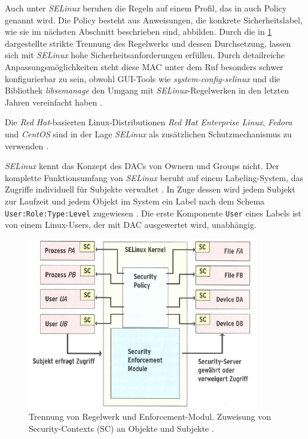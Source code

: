 \documentclass[../main.tex]{subfiles}
\begin{document}

				Auch unter \emph{SELinux} beruhen die Regeln auf einem Profil, das in auch Policy genannt wird. Die Policy besteht aus Anweisungen, die konkrete Sicherheitslabel, wie sie im nächsten Abschnitt beschrieben sind, abbilden. Durch die in \fig \ref{fig:sec_SELinux} dargestellte strikte Trennung des Regelwerks und dessen Durchsetzung, lassen sich mit \emph{SELinux} hohe Sicherheitsanforderungen erfüllen. Durch detailreiche Anpassungsmöglichkeiten steht diese MAC unter dem Ruf besonders schwer konfigurierbar zu sein, obwohl GUI-Tools wie \emph{system-config-selinux} und die Bibliothek \emph{libsemanage} den Umgang mit \emph{SELinux}-Regelwerken in den letzten Jahren vereinfacht haben \cite[S.62,S.67]{linuxMagazineSec}.

				Die \emph{Red Hat}-basierten Linux-Distributionen \emph{Red Hat Enterprise Linux}, \emph{Fedora} und \emph{CentOS} sind in der Lage \emph{SELinux} als zusätzlichen Schutzmechanismus zu verwenden \cite{dockerSecurity}.

				\emph{SELinux} kennt das Konzept des DACs von Ownern und Groups nicht. Der komplette Funktionsumfang von \emph{SELinux} beruht auf einem Labeling-System, das Zugriffe individuell für Subjekte verwaltet \cite{SELinuxComic}. In Zuge dessen wird jedem Subjekt zur Laufzeit und jedem Objekt im System ein Label nach dem Schema \texttt{User:Role:Type:Level} zugewiesen \cite{atomicDockerSELinux}. Die erste Komponente \texttt{User} eines Labels ist von einem Linux-Users, der mit \acrshort{DAC} ausgewertet wird, unabhängig.

				\begin{figure}[h]
						\centering
						\includegraphics[width=0.9\textwidth]{./images/sec_SELinux.jpg}
						\caption{Trennung von Regelwerk und Enforcement-Modul. Zuweisung von Security-Contexts (SC) an Objekte und Subjekte \cite[S.63]{linuxMagazineSec}.}
						\label{fig:sec_SELinux}
				\end{figure}
\end{document}
